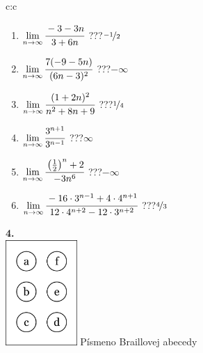 \documentclass[10pt]{report}
\begin{document}
\begin{tabular}{c:c}
\begin{minipage}[c][104.5mm][t]{0.5\linewidth}
\begin{center}
\begin{minipage}{0.79\linewidth}
\begin{center}
\begin{varwidth}{\linewidth}
\begin{enumerate}
\normalsize
\item $\lim\limits_{n\to\infty}\cfrac{-3-3n}{3+6n}$\quad \dotfill\; ???\;\dotfill \quad $\nicefrac{-1}{2}$
\item $\lim\limits_{n\to\infty}\cfrac{7(-9-5n)}{(6n-3)^2}$\quad \dotfill\; ???\;\dotfill \quad $-\infty$
\item $\lim\limits_{n\to\infty}\cfrac{(1+2n)^2}{n^2+8n+9}$\quad \dotfill\; ???\;\dotfill \quad $\nicefrac{1}{4}$
\item $\lim\limits_{n\to\infty}\cfrac{3^{n+1}}{3^{n-1}}$\quad \dotfill\; ???\;\dotfill \quad $\infty$
\item $\lim\limits_{n\to\infty}\cfrac{\left(\frac{1}{2}\right)^n +2}{-3n^{6}}$\quad \dotfill\; ???\;\dotfill \quad $-\infty$
\item $\lim\limits_{n\to\infty}\cfrac{-16\cdot 3^{n-1}+4\cdot 4^{n+1}}{12\cdot 4^{n+2}-12\cdot 3^{n+2}}$\quad \dotfill\; ???\;\dotfill \quad $\nicefrac{4}{3}$
\end{enumerate}
\end{varwidth}
\end{center}
\end{minipage}
\begin{minipage}{0.20\linewidth}
\begin{center}
{\Huge\bfseries 4.} \\[2mm]
\includegraphics[height=40mm]{../images/braille.png}
{\small Písmeno Braillovej abecedy}
\end{center}
\end{minipage}
\end{center}
\end{minipage}
%
\end{tabular}
\newpage
\thispagestyle{empty}
\end{document}
